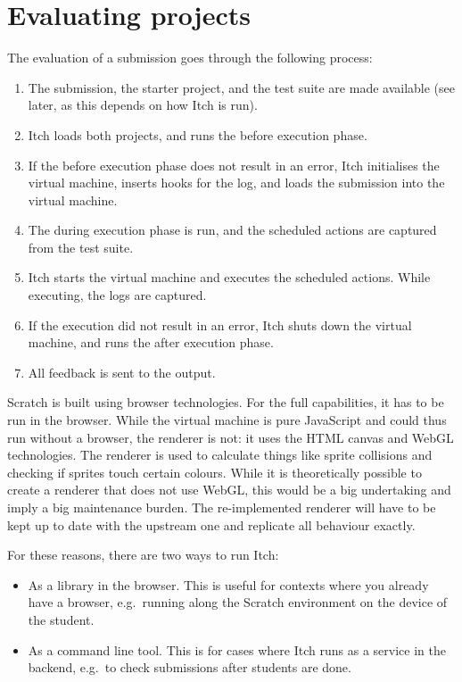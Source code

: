 \documentclass[../main]{subfiles}
\begin{document}
\section{Evaluating projects}\label{sec:itch-evaluating-projects}

The evaluation of a submission goes through the following process:

\begin{enumerate}
    \item The submission, the starter project, and the test suite are made available (see later, as this depends on how Itch is run).
    \item Itch loads both projects, and runs the before execution phase.
    \item If the before execution phase does not result in an error, Itch initialises the virtual machine, inserts hooks for the log, and loads the submission into the virtual machine.
    \item The during execution phase is run, and the scheduled actions are captured from the test suite.
    \item Itch starts the virtual machine and executes the scheduled actions.
          While executing, the logs are captured.
    \item If the execution did not result in an error, Itch shuts down the virtual machine, and runs the after execution phase.
    \item All feedback is sent to the output.
\end{enumerate}

Scratch is built using browser technologies.
For the full capabilities, it has to be run in the browser.
While the virtual machine is pure JavaScript and could thus run without a browser, the renderer is not: it uses the HTML canvas and WebGL technologies.
The renderer is used to calculate things like sprite collisions and checking if sprites touch certain colours.
While it is theoretically possible to create a renderer that does not use WebGL, this would be a big undertaking and imply a big maintenance burden.
The re-implemented renderer will have to be kept up to date with the upstream one and replicate all behaviour exactly.

For these reasons, there are two ways to run Itch:

\begin{itemize}
    \item As a library in the browser.
          This is useful for contexts where you already have a browser, e.g.\ running along the Scratch environment on the device of the student.
    \item As a command line tool.
          This is for cases where Itch runs as a service in the backend, e.g.\ to check submissions after students are done.
\end{itemize}
\end{document}
